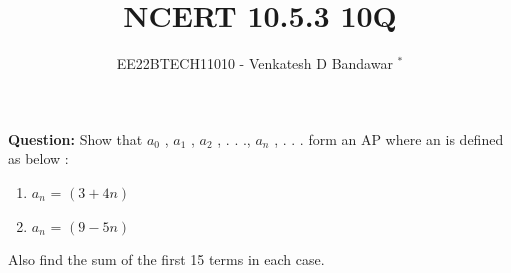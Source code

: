 \documentclass[journal,12pt,twocolumn]{IEEEtran}
\theoremstyle{remark}
\begin{document}

\vspace{3cm}

\title{NCERT 10.5.3 10Q}
\author{EE22BTECH11010 - Venkatesh D Bandawar $^{*}$%
}
\maketitle
\newpage
\bigskip

\renewcommand{\thefigure}{\theenumi}
\renewcommand{\thetable}{\theenumi}

\textbf{Question:} Show that $a_0$ , $a_1$ , $a_2$
, . . ., $a_n$
, . . . form an AP where an is defined as below :
\begin{enumerate}
    \item $a_n$ = $(3 + 4n)$ 
    \item $a_n$ = $(9 - 5n)$ 
\end{enumerate}
Also find the sum of the first 15 terms in each case.
\end{document}
